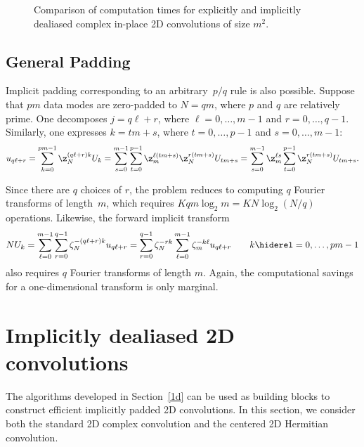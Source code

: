 \documentclass[final]{siamltex}
\def\no{\hiderel}
\begin{document}
\begin{figure}[htbp]
\begin{minipage}{0.5\linewidth}
\begin{center}
\caption{Comparison of computation times for explicitly and implicitly
dealiased complex in-place 2D convolutions of size $m^2$.}
\label{timing2c}
\end{center}
\end{minipage}
\end{figure}

\subsection{General Padding}\label{pq}
Implicit padding corresponding to an arbitrary~$p/q$ rule is also
possible. Suppose that $pm$ data modes are zero-padded to $N=qm$, where $p$
and $q$ are relatively prime. One decomposes $j=q\ell+r$, where
$\ell=0,\dots,m-1$ and $r=0,\dots,q-1$.
Similarly, one expresses $k=t m+s$, where $t=0,\dots,p-1$ and $s=0,\dots, m-1$:
$$
u_{q\ell+r}=\sum_{k=0}^{pm-1}\z_N^{(q\ell+r)k} U_k
=\sum_{s=0}^{m-1}\sum_{t=0}^{p-1} \z_m^{\ell (t m+s)}\z_{N}^{r(t m+s)}
U_{t m+s}
=\sum_{s=0}^{m-1}\z_m^{\ell s}\sum_{t=0}^{p-1}\z_N^{r(t m+s)} U_{t m+s}.
$$

Since there are $q$ choices of $r$, the problem reduces
to computing $q$ Fourier transforms of length~$m$, which requires
$K q m\log_2 m=K N\log_2 (N/q)$ operations. 
Likewise, the forward implicit transform
$$
NU_k
=\sum_{\ell=0}^{m-1}\sum_{r=0}^{q-1} \zeta_N^{-(q\ell+r)k} u_{q\ell+r}
=\sum_{r=0}^{q-1}\zeta_N^{-rk}\sum_{\ell=0}^{m-1}\zeta_m^{-k\ell} u_{q\ell+r}
\qquad k\no =0,\ldots,pm-1
$$
also requires $q$ Fourier transforms of length $m$. Again, the computational
savings for a one-dimensional transform is only marginal.

\section{Implicitly dealiased 2D convolutions}\label{2d}
The algorithms developed in Section~\ref{1d} can be used as building
blocks to construct efficient implicitly padded 2D convolutions.
In this section, we consider both the standard 2D complex convolution and the
centered 2D Hermitian convolution.
\end{document}
